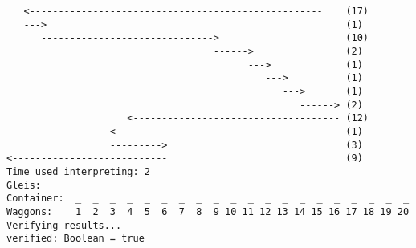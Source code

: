 \begin{lstlisting}
   <---------------------------------------------------    (17)
   --->                                                    (1)
      ------------------------------>                      (10)
                                    ------>                (2)
                                          --->             (1)
                                             --->          (1)
                                                --->       (1)
                                                   ------> (2)
                     <------------------------------------ (12)
                  <---                                     (1)
                  --------->                               (3)
<---------------------------                               (9)
Time used interpreting: 2
Gleis: 
Container:  _  _  _  _  _  _  _  _  _  _  _  _  _  _  _  _  _  _  _  _
Waggons:    1  2  3  4  5  6  7  8  9 10 11 12 13 14 15 16 17 18 19 20
Verifying results...
verified: Boolean = true
\end{lstlisting}
